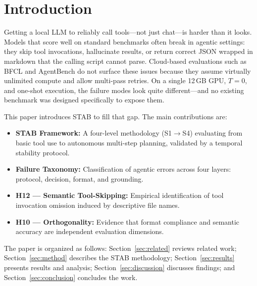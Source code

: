 \documentclass{kdmile}
\begin{document}
\section{Introduction}
\label{sec:intro}

Getting a local LLM to reliably call tools—not just chat—is harder than it looks.
Models that score well on standard benchmarks often break in agentic settings:
they skip tool invocations, hallucinate results, or return correct JSON
wrapped in markdown that the calling script cannot parse.
Cloud-based evaluations such as BFCL and AgentBench do not surface these issues
because they assume virtually unlimited compute and allow multi-pass retries.
On a single 12\,GB GPU, $T=0$, and one-shot execution, the failure modes look
quite different—and no existing benchmark was designed specifically to expose them.

This paper introduces STAB to fill that gap. The main contributions are:

\begin{itemize}
  \item \textbf{STAB Framework:} A four-level methodology (S1$\rightarrow$S4)
        evaluating from basic tool use to autonomous multi-step planning,
        validated by a temporal stability protocol.

  \item \textbf{Failure Taxonomy:} Classification of agentic errors across four
        layers: protocol, decision, format, and grounding.

  \item \textbf{H12 — Semantic Tool-Skipping:} Empirical identification of
        tool invocation omission induced by descriptive file names.

  \item \textbf{H10 — Orthogonality:} Evidence that format compliance and
        semantic accuracy are independent evaluation dimensions.
\end{itemize}

The paper is organized as follows: Section~\ref{sec:related} reviews related
work; Section~\ref{sec:method} describes the STAB methodology;
Section~\ref{sec:results} presents results and analysis;
Section~\ref{sec:discussion} discusses findings; and
Section~\ref{sec:conclusion} concludes the work.

\end{document}
